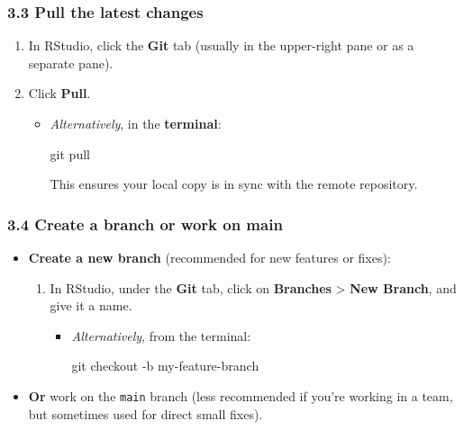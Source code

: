 \documentclass[
  letterpaper,
  DIV=11,
  numbers=noendperiod]{scrartcl}
\newenvironment{Shaded}{\begin{snugshade}}{\end{snugshade}}
\newcommand{\AttributeTok}[1]{\textcolor[rgb]{0.40,0.45,0.13}{#1}}
\newcommand{\FunctionTok}[1]{\textcolor[rgb]{0.28,0.35,0.67}{#1}}
\newcommand{\NormalTok}[1]{\textcolor[rgb]{0.00,0.23,0.31}{#1}}
\providecommand{\tightlist}{%
  \setlength{\itemsep}{0pt}\setlength{\parskip}{0pt}}\usepackage{longtable,booktabs,array}
\begin{document}
\subsubsection{3.3 Pull the latest
changes}\label{pull-the-latest-changes}

\begin{enumerate}
\def\labelenumi{\arabic{enumi}.}
\tightlist
\item
  In RStudio, click the \textbf{Git} tab (usually in the upper-right
  pane or as a separate pane).\\
\item
  Click \textbf{Pull}.

  \begin{itemize}
  \item
    \emph{Alternatively}, in the \textbf{terminal}:

\begin{Shaded}
\begin{Highlighting}[]
\FunctionTok{git}\NormalTok{ pull}
\end{Highlighting}
\end{Shaded}

    This ensures your local copy is in sync with the remote repository.
  \end{itemize}
\end{enumerate}

\subsubsection{3.4 Create a branch or work on
main}\label{create-a-branch-or-work-on-main}

\begin{itemize}
\tightlist
\item
  \textbf{Create a new branch} (recommended for new features or fixes):

  \begin{enumerate}
  \def\labelenumi{\arabic{enumi}.}
  \tightlist
  \item
    In RStudio, under the \textbf{Git} tab, click on \textbf{Branches}
    \textgreater{} \textbf{New Branch}, and give it a name.

    \begin{itemize}
    \item
      \emph{Alternatively}, from the terminal:

\begin{Shaded}
\begin{Highlighting}[]
\FunctionTok{git}\NormalTok{ checkout }\AttributeTok{{-}b}\NormalTok{ my{-}feature{-}branch}
\end{Highlighting}
\end{Shaded}
    \end{itemize}
  \end{enumerate}
\item
  \textbf{Or} work on the \texttt{main} branch (less recommended if
  you're working in a team, but sometimes used for direct small fixes).
\end{itemize}
\end{document}
